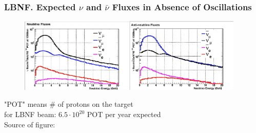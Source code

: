 \begin{frame}\frametitle{LBNF. Expected $\nu$ and $\bar{\nu}$ Fluxes in Absence of Oscillations}
\begin{figure}
\centering
\includegraphics[width=0.48\textwidth, keepaspectratio=true]{figs/LBNF_nuFlux01.png}\includegraphics[width=0.48\textwidth, keepaspectratio=true]{figs/LBNF_nuFlux02.png}  
\end{figure}
\scriptsize
"POT" means \# of protons on the target\\
for LBNF beam: $6.5\cdot10^{20}$ POT per year expected\\
\tiny
Source of figure: \cite{ref_LBNF_CDR_volumeBeam}
\end{frame}


